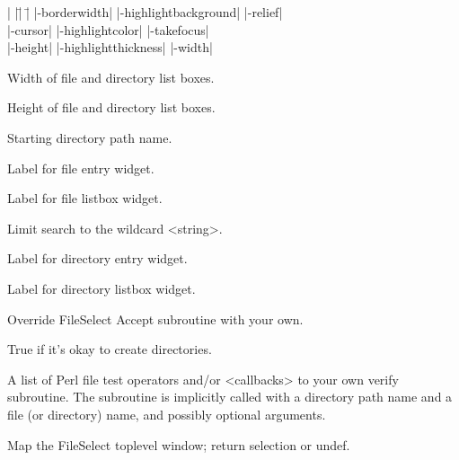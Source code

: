 \begin{tabbing}
|                   |\=|                     |\= \kill
|-borderwidth| \> |-highlightbackground|     \> |-relief| \\   
|-cursor|      \> |-highlightcolor|          \> |-takefocus| \\
|-height|      \> |-highlightthickness|      \> |-width| \\
\end{tabbing}

\vskip5pt

\begin{enum}{1cm}

Width of file  and directory list boxes.

Height of file  and directory list boxes.

Starting directory path name.

Label for file entry widget.

Label for file listbox widget.

Limit search to the wildcard <string>.

Label for directory entry widget.

Label for directory listbox widget.

Override FileSelect Accept subroutine with your own.

True if it's okay to create directories.

A list of Perl file test operators and/or <callbacks> to your own verify
subroutine.  The subroutine is implicitly called with a directory path
name and a file (or directory) name, and possibly optional arguments.

\end{enum}

\vskip5pt

\begin{enum}{1cm}

Map the FileSelect toplevel window; return selection or undef.

\end{enum}

